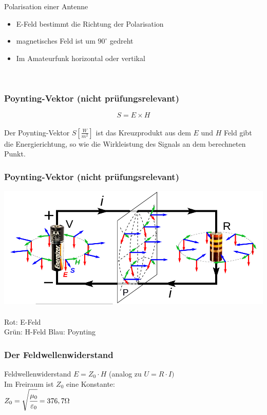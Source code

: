 \begin{frame}
\begin{center}
\begin{minipage}{0.45\textwidth}
      {\tiny Polarisation einer Antenne}
      \begin{itemize}
	\item E-Feld bestimmt die Richtung der Polarisation
	\item magnetisches Feld ist um $90^\circ$ gedreht
	\item Im Amateurfunk horizontal oder vertikal
      \end{itemize}
    \end{minipage}\\[1.5em]
  \end{center}
\end{frame}

\begin{frame}
    \frametitle{Poynting-Vektor (nicht prüfungsrelevant)}
    \begin{center}
		\huge $$S = E \times H$$ \\[1em]
		\large Der Poynting-Vektor $S[\frac{W}{m^2}]$ ist das Kreuzprodukt aus dem $E$ und $H$ Feld gibt die Energierichtung, so wie die Wirkleistung des Signals an dem berechneten Punkt.
	\end{center}
\end{frame}

\begin{frame}
    \frametitle{Poynting-Vektor (nicht prüfungsrelevant)}
    \begin{center}
		\includegraphics[width=1\textwidth]{a08/Poynting_vectors_of_DC_circuit.png}\\
		\tiny \hyperlink{refs}{\cite{wm}} \\[1em] \large
		Rot: E-Feld \\
		Grün: H-Feld
		Blau: Poynting
	\end{center}
\end{frame}

\begin{frame}
    \frametitle{Der Feldwellenwiderstand}
    \begin{block}{Feldwellenwiderstand}
      $E = Z_0 \cdot H$ \hspace{2cm} (analog zu $U = R \cdot I)$ \\[1em]
      Im Freiraum ist $Z_0$ eine Konstante: \\[1em]
      $Z_0 = \sqrt{\cfrac{\mu_0}{\varepsilon_0}} = 376,7 \Omega$ \\[1em]
  \end{block}
\end{frame}


